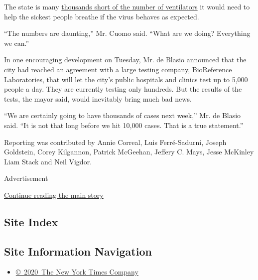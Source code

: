 The state is many
\href{https://www.nytimes.com/2020/03/17/nyregion/ny-coronavirus-ventilators.html}{thousands
short of the number of ventilators} it would need to help the sickest
people breathe if the virus behaves as expected.

``The numbers are daunting,'' Mr. Cuomo said. ``What are we doing?
Everything we can.''

In one encouraging development on Tuesday, Mr. de Blasio announced that
the city had reached an agreement with a large testing company,
BioReference Laboratories, that will let the city's public hospitals and
clinics test up to 5,000 people a day. They are currently testing only
hundreds. But the results of the tests, the mayor said, would inevitably
bring much bad news.

``We are certainly going to have thousands of cases next week,'' Mr. de
Blasio said. ``It is not that long before we hit 10,000 cases. That is a
true statement.''

Reporting was contributed by Annie Correal, Luis Ferré-Sadurní, Joseph
Goldstein, Corey Kilgannon, Patrick McGeehan, Jeffery C. Mays, Jesse
McKinley Liam Stack and Neil Vigdor.

Advertisement

\protect\hyperlink{after-bottom}{Continue reading the main story}

\hypertarget{site-index}{%
\subsection{Site Index}\label{site-index}}

\hypertarget{site-information-navigation}{%
\subsection{Site Information
Navigation}\label{site-information-navigation}}

\begin{itemize}
\tightlist
\item
  \href{https://help.nytimes.com/hc/en-us/articles/115014792127-Copyright-notice}{©~2020~The
  New York Times Company}
\end{itemize}

